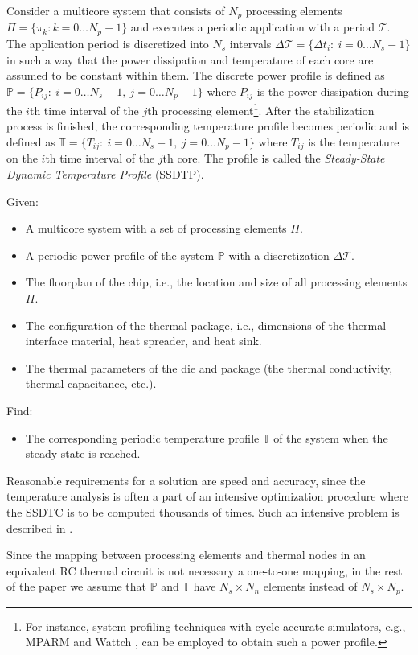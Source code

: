 Consider a multicore system that consists of $N_p$ processing elements $\Pi = \{ \pi_k: k = 0 \dots N_p - 1 \}$ and executes a periodic application with a period $\mathcal{T}$. The application period is discretized into $N_s$ intervals $\Delta \mathcal{T} = \{ \Delta t_i: \: i = 0 \dots N_s - 1 \}$ in such a way that the power dissipation and temperature of each core are assumed to be constant within them. The discrete power profile is defined as $\mathbb{P} = \{ P_{ij}: \: i = 0 \dots N_s - 1, \: j = 0 \dots N_p - 1 \}$ where $P_{ij}$ is the power dissipation during the $i$th time interval of the $j$th processing element\footnote{For instance, system profiling techniques with cycle-accurate simulators, e.g., MPARM \cite{benini2005} and Wattch \cite{brooks2000}, can be employed to obtain such a power profile.}. After the stabilization process is finished, the corresponding temperature profile becomes periodic and is defined as $\mathbb{T} = \{ T_{ij}: \: i = 0 \dots N_s - 1, \: j = 0 \dots N_p - 1 \}$ where $T_{ij}$ is the temperature on the $i$th time interval of the $j$th core. The profile is called the \emph{Steady-State Dynamic Temperature Profile} (SSDTP).

Given:
\begin{itemize}
  \item A multicore system with a set of processing elements $\Pi$.
  \item A periodic power profile of the system $\mathbb{P}$ with a discretization $\Delta \mathcal{T}$.
  \item The floorplan of the chip, i.e., the location and size of all processing elements $\Pi$.
  \item The configuration of the thermal package, i.e., dimensions of the thermal interface material, heat spreader, and heat sink.
  \item The thermal parameters of the die and package (the thermal conductivity, thermal capacitance, etc.).
\end{itemize}

Find:
\begin{itemize}
  \item The corresponding periodic temperature profile $\mathbb{T}$ of the system when the steady state is reached.
\end{itemize}

Reasonable requirements for a solution are speed and accuracy, since the temperature analysis is often a part of an intensive optimization procedure where the SSDTC is to be computed thousands of times. Such an intensive problem is described in .

Since the mapping between processing elements and thermal nodes in an equivalent RC thermal circuit is not necessary a one-to-one mapping, in the rest of the paper we assume that $\mathbb{P}$ and $\mathbb{T}$ have $N_s \times N_n$ elements instead of $N_s \times N_p$.
